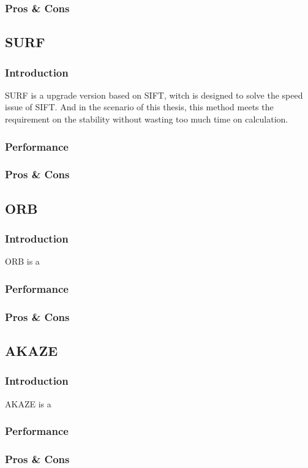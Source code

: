 		\subsubsection{Pros \& Cons}
	
	\subsection{SURF}
		\subsubsection{Introduction}
		SURF is a upgrade version based on SIFT, witch is designed to solve the speed issue of SIFT. 
		And in the scenario of this thesis, this method meets the requirement on the stability without wasting too much time on calculation.
		\subsubsection{Performance}
		\subsubsection{Pros \& Cons}

	\subsection{ORB}
		\subsubsection{Introduction}
		ORB is a
		\subsubsection{Performance}
		\subsubsection{Pros \& Cons}

	\subsection{AKAZE}
		\subsubsection{Introduction}
		AKAZE is a
		\subsubsection{Performance}
		\subsubsection{Pros \& Cons}